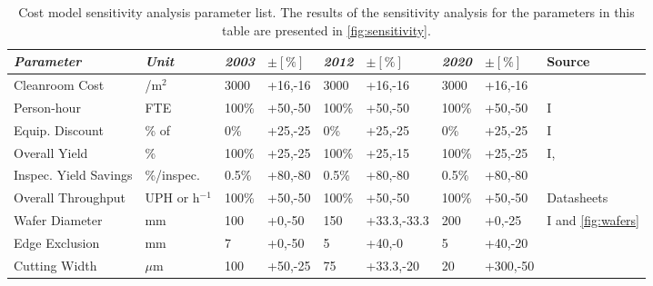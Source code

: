 \documentclass[parskip=full]{article}
\begin{document}
\begin{table}[]
\small
    \caption{Cost model sensitivity analysis parameter list. The results of the sensitivity analysis for the parameters in this table are presented in \cref{fig:sensitivity}.}
    \vspace{5mm}
    \begin{NiceTabularX}{\textwidth}{ |X|X|l|l|l|l|l|l|X|}
        \hline
            \textit{Parameter} & \textit{Unit} & \textit{2003} & $\pm [\%]$ & \textit{2012} & $\pm [\%]$ & \textit{2020} & $\pm [\%]$ & Source \\
        \hline
            Cleanroom Cost & /m$^2$ & 3000 & +16,-16 & 3000 & +16,-16 & 3000 & +16,-16 & \cite{mddi1997cleanroom}\cite{ledcomv2} \newline \cite{bakshi2009euv}\cite{gajera2006process} \\
        \hline
            Person-hour & FTE & 100\% & +50,-50 & 100\% & +50,-50 & 100\% & +50,-50 & I \\
        \hline
            Equip. Discount & \% of  & 0\% & +25,-25 & 0\% & +25,-25 & 0\% & +25,-25 & I \newline \cite{Appleyard_2001} \\
        \hline
            Overall Yield & \% & 100\% & +25,-25 & 100\% & +25,-15 & 100\% & +25,-25 & I, \cite{lumi2012yield}\cite{ledsmag2012} \newline \cite{systemplus2015reverse}\cite{ledcomv2} \\
        \hline
            Inspec. Yield Savings & \%/inspec. & 0.5\% & +80,-80 & 0.5\% & +80,-80 & 0.5\% & +80,-80 & \cite{mckinseyyield} \\
        \hline
            Overall Throughput & UPH or h$^{-1}$ & 100\% & +50,-50 & 100\% & +50,-50 & 100\% & +50,-50 & Datasheets \\
        \hline
            Wafer Diameter & mm & 100 & +0,-50 & 150 & +33.3,-33.3 & 200 & +0,-25 & I and \cref{fig:wafers} \\
        \hline
            Edge Exclusion & mm & 7 & +0,-50 & 5 & +40,-0 & 5 & +40,-20 & \cite{ledsmagexclusion}\cite{rubiconexclusion} \newline \cite{xiamenexclusion}\cite{american2007annual} \\
        \hline
            Cutting Width & $\mu$m & 100 & +50,-25 & 75 & +33.3,-20 & 20 & +300,-50 & \cite{masaki2000division}\cite{ils2005width} \newline \cite{photonics2010width}\cite{discowidth} \\

\end{NiceTabularX}
\end{table}
\end{document}
